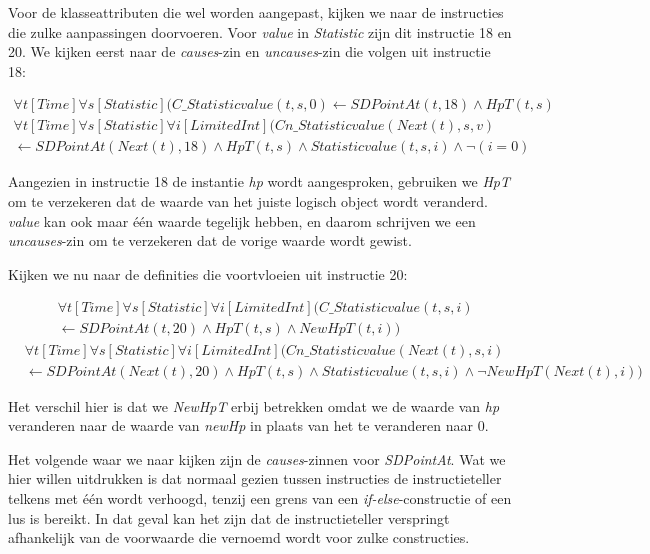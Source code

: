 Voor de klasseattributen die wel worden aangepast, kijken we naar de instructies die zulke aanpassingen doorvoeren. Voor \textit{value} in \textit{Statistic} zijn dit instructie 18 en 20. We kijken eerst naar de \textit{causes}-zin en \textit{uncauses}-zin die volgen uit instructie 18:

\begin{align*}
	\forall{t}[Time]\forall{s}[Statistic](C\_Statisticvalue(t, s, 0) \leftarrow SDPointAt(t, 18) \land HpT(t, s)
\end{align*}
\begin{align*}
	\forall{t}[Time]\forall{s}[Statistic]\forall{i}[LimitedInt](Cn\_Statisticvalue(Next(t), s, v) \\ \leftarrow SDPointAt(Next(t), 18) \land HpT(t, s) \land Statisticvalue(t, s, i) \land \lnot{}(i = 0)
\end{align*}

Aangezien in instructie 18 de instantie \textit{hp} wordt aangesproken, gebruiken we \textit{HpT} om te verzekeren dat de waarde van het juiste logisch object wordt veranderd. \textit{value} kan ook maar \'e\'en waarde tegelijk hebben, en daarom schrijven we een \textit{uncauses}-zin om te verzekeren dat de vorige waarde wordt gewist.

Kijken we nu naar de definities die voortvloeien uit instructie 20:

\begin{align*}
	&\forall{t}[Time]\forall{s}[Statistic]\forall{i}[LimitedInt](C\_Statisticvalue(t, s, i) \\ &\leftarrow SDPointAt(t, 20) \land HpT(t, s) \land NewHpT(t, i))
\end{align*}
\begin{align*}
&\forall{t}[Time]\forall{s}[Statistic]\forall{i}[LimitedInt](Cn\_Statisticvalue(Next(t), s, i) \\ &\leftarrow SDPointAt(Next(t), 20) \land HpT(t, s) \land Statisticvalue(t, s, i) \land \lnot{}NewHpT(Next(t), i))
\end{align*}

Het verschil hier is dat we \textit{NewHpT} erbij betrekken omdat we de waarde van \textit{hp} veranderen naar de waarde van \textit{newHp} in plaats van het te veranderen naar 0.

\parbreak

Het volgende waar we naar kijken zijn de \textit{causes}-zinnen voor \textit{SDPointAt}. Wat we hier willen uitdrukken is dat normaal gezien tussen instructies de instructieteller telkens met \'e\'en wordt verhoogd, tenzij een grens van een \textit{if-else}-constructie of een lus is bereikt. In dat geval kan het zijn dat de instructieteller verspringt afhankelijk van de voorwaarde die vernoemd wordt voor zulke constructies.

